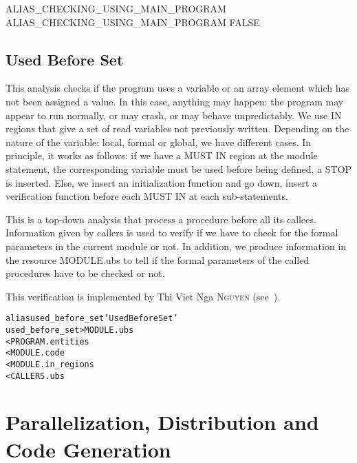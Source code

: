 \documentclass[a4paper]{report}
\newenvironment{PipsMake}{\begin{alltt}}{\end{alltt}}
\newenvironment{PipsPass}[1]{\label{pass:#1}}{}
\begin{document}
\begin{PipsProp}{ALIAS_CHECKING_USING_MAIN_PROGRAM}
ALIAS_CHECKING_USING_MAIN_PROGRAM FALSE
\end{PipsProp}

\section{Used Before Set}
\label{subsection-used-before_set}

\begin{PipsPass}{used_before_set}
This analysis checks if the program uses a variable or an array element
which has not been assigned a value. In this case, anything may happen:
the program may appear to run normally, or may
crash, or may behave unpredictably. We use IN regions
that give a set of read variables not previously written. Depending on the
nature of the variable: local, formal or global, we have different
cases. In principle, it
works as follows: if we have a MUST IN region at the module statement, the
corresponding variable must be used before
being defined, a STOP is inserted. Else, we insert an initialization
function and go down, insert a verification function before each MUST IN
at each sub-statements.

This is a top-down analysis that process a procedure before all its
callees. Information given by callers is used to verify if we have to
check for the formal parameters in the current module or not. In addition,
we produce information in the resource MODULE.ubs to tell if the formal
parameters of the called procedures have to be checked or not.

This verification is implemented by Thi Viet Nga \textsc{Nguyen} (see~\cite{Ngu02}).
\end{PipsPass}

\begin{PipsMake}
alias used_before_set 'Used Before Set'
used_before_set   > MODULE.ubs
        < PROGRAM.entities
        < MODULE.code
        < MODULE.in_regions
        < CALLERS.ubs
\end{PipsMake}



\chapter{Parallelization, Distribution and Code Generation}
\label{section-program-transformations-parallelization-distribution}
\end{document}
